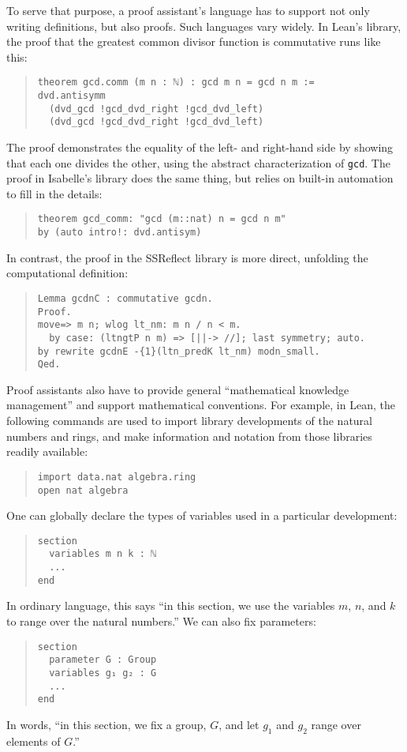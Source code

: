 \documentclass[11pt]{article}
\newcommand{\ttt}[1]{\texttt{#1}}
\begin{document}
To serve that purpose, a proof assistant's language has to support not only writing definitions, but also proofs. Such languages vary widely. In Lean's library, the proof that the greatest common divisor function is commutative runs like this:
\begin{quote}\begin{lstlisting}
theorem gcd.comm (m n : ℕ) : gcd m n = gcd n m :=
dvd.antisymm
  (dvd_gcd !gcd_dvd_right !gcd_dvd_left)
  (dvd_gcd !gcd_dvd_right !gcd_dvd_left) 
\end{lstlisting}\end{quote}
The proof demonstrates the equality of the left- and right-hand side by showing that each one divides the other, using the abstract characterization of \ttt{gcd}. The proof in Isabelle's library does the same thing, but relies on built-in automation to fill in the details:
\begin{quote}\begin{lstlisting}
theorem gcd_comm: "gcd (m::nat) n = gcd n m"
by (auto intro!: dvd.antisym) 
\end{lstlisting}\end{quote}
In contrast, the proof in the SSReflect library is more direct, unfolding the computational definition:
\begin{quote}\begin{lstlisting}
Lemma gcdnC : commutative gcdn.
Proof.
move=> m n; wlog lt_nm: m n / n < m.
  by case: (ltngtP n m) => [||-> //]; last symmetry; auto.
by rewrite gcdnE -{1}(ltn_predK lt_nm) modn_small.
Qed. 
\end{lstlisting}\end{quote}

Proof assistants also have to provide general ``mathematical knowledge management'' and support mathematical conventions. For example, in Lean, the following commands are used to import library developments of the natural numbers and rings, and make information and notation from those libraries readily available:
\begin{quote}\begin{lstlisting}
import data.nat algebra.ring
open nat algebra
\end{lstlisting}\end{quote}
One can globally declare the types of variables used in a particular development:
\begin{quote}\begin{lstlisting}
section
  variables m n k : ℕ
  ...
end
\end{lstlisting}\end{quote}
In ordinary language, this says ``in this section, we use the variables $m$, $n$, and $k$ to range over the natural numbers.'' We can also fix parameters:
\begin{quote}\begin{lstlisting}
section
  parameter G : Group
  variables g₁ g₂ : G
  ...
end
\end{lstlisting}\end{quote}
In words, ``in this section, we fix a group, $G$, and let $g_1$ and $g_2$ range over elements of $G$.''
\end{document}
